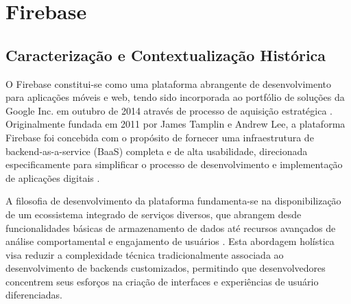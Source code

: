 \documentclass[
	12pt,				    %
	openright,			    %
	oneside,			    %
	a4paper,			    %
    sumario=tradicional,    %
	english,			    %
	brazil,				    %
	]{abntex2}              %
\begin{document}

\section{Firebase}
\subsection{Caracterização e Contextualização Histórica}

O Firebase constitui-se como uma plataforma abrangente de desenvolvimento para aplicações móveis e web, tendo sido incorporada ao portfólio de soluções da Google Inc. em outubro de 2014 através de processo de aquisição estratégica \cite{google2014firebase}. Originalmente fundada em 2011 por James Tamplin e Andrew Lee, a plataforma Firebase foi concebida com o propósito de fornecer uma infraestrutura de backend-as-a-service (BaaS) completa e de alta usabilidade, direcionada especificamente para simplificar o processo de desenvolvimento e implementação de aplicações digitais \cite{tamplin2021firebase}.

A filosofia de desenvolvimento da plataforma fundamenta-se na disponibilização de um ecossistema integrado de serviços diversos, que abrangem desde funcionalidades básicas de armazenamento de dados até recursos avançados de análise comportamental e engajamento de usuários \cite{firebase2023docs}. Esta abordagem holística visa reduzir a complexidade técnica tradicionalmente associada ao desenvolvimento de backends customizados, permitindo que desenvolvedores concentrem seus esforços na criação de interfaces e experiências de usuário diferenciadas.
\end{document}
